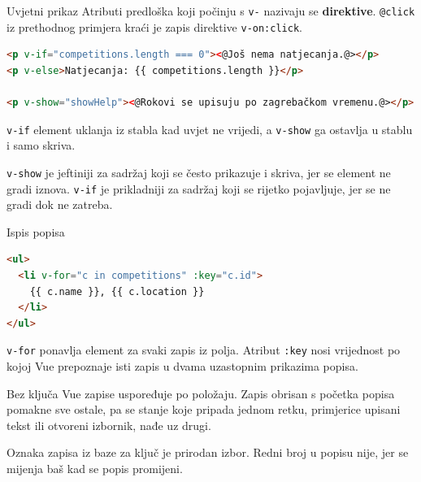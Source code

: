 \begin{frame}[fragile]{Uvjetni prikaz}
Atributi predloška koji počinju s \texttt{v-} nazivaju se \textbf{direktive}. \texttt{@click} iz prethodnog primjera kraći je zapis direktive \texttt{v-on:click}.

\begin{lstlisting}[language=html]
<p v-if="competitions.length === 0"><@Još nema natjecanja.@></p>
<p v-else>Natjecanja: {{ competitions.length }}</p>

<p v-show="showHelp"><@Rokovi se upisuju po zagrebačkom vremenu.@></p>
\end{lstlisting}

\vspace{0.3em}
\texttt{v-if} element uklanja iz stabla kad uvjet ne vrijedi, a \texttt{v-show} ga ostavlja u stablu i samo skriva.

\vspace{0.3em}
\texttt{v-show} je jeftiniji za sadržaj koji se često prikazuje i skriva, jer se element ne gradi iznova. \texttt{v-if} je prikladniji za sadržaj koji se rijetko pojavljuje, jer se ne gradi dok ne zatreba.
\end{frame}

\begin{frame}[fragile]{Ispis popisa}
\begin{lstlisting}[language=html]
<ul>
  <li v-for="c in competitions" :key="c.id">
    {{ c.name }}, {{ c.location }}
  </li>
</ul>
\end{lstlisting}

\vspace{0.3em}
\texttt{v-for} ponavlja element za svaki zapis iz polja. Atribut \texttt{:key} nosi vrijednost po kojoj Vue prepoznaje isti zapis u dvama uzastopnim prikazima popisa.

\vspace{0.3em}
Bez ključa Vue zapise uspoređuje po položaju. Zapis obrisan s početka popisa pomakne sve ostale, pa se stanje koje pripada jednom retku, primjerice upisani tekst ili otvoreni izbornik, nađe uz drugi.

\vspace{0.3em}
Oznaka zapisa iz baze za ključ je prirodan izbor. Redni broj u popisu nije, jer se mijenja baš kad se popis promijeni.
\end{frame}

